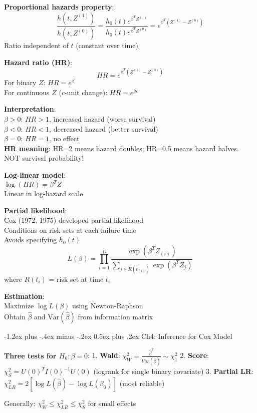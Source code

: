 ﻿\documentclass[10pt,letterpaper]{extarticle}
\makeatletter
\renewcommand{\section}{\@startsection{section}{1}{0mm}%
                                {-1.2ex plus -.4ex minus -.2ex}%
                                {0.5ex plus .2ex}%
                                {\normalfont\normalsize\bfseries}}
\newcommand{\h}[1]{\textbf{#1}}
\makeatother
\begin{document}
\begin{multicols}{3}
\h{Proportional hazards property}: \\
$$\frac{h(t, Z^{(1)})}{h(t, Z^{(0)})} = \frac{h_0(t)e^{\beta^T Z^{(1)}}}{h_0(t)e^{\beta^T Z^{(0)}}} = e^{\beta^T(Z^{(1)}-Z^{(0)})}$$
Ratio independent of $t$ (constant over time)

\h{Hazard ratio (HR)}: \\
$$HR = e^{\beta^T(Z^{(1)} - Z^{(0)})}$$
For binary $Z$: $HR = e^\beta$ \\
For continuous $Z$ ($c$-unit change): $HR = e^{\beta c}$

\h{Interpretation}: \\
$\beta > 0$: $HR > 1$, increased hazard (worse survival) \\
$\beta < 0$: $HR < 1$, decreased hazard (better survival) \\
$\beta = 0$: $HR = 1$, no effect \\
\h{HR meaning}: HR=2 means hazard doubles; HR=0.5 means hazard halves. NOT survival probability!

\h{Log-linear model}: \\
$\log(HR) = \beta^T Z$ \\
Linear in log-hazard scale

\h{Partial likelihood}: \\
Cox (1972, 1975) developed partial likelihood \\
Conditions on risk sets at each failure time \\
Avoids specifying $h_0(t)$ \\
$$L(\beta) = \prod_{i=1}^D \frac{\exp(\beta^T Z_{(i)})}{\sum_{j \in R(t_{(i)})} \exp(\beta^T Z_j)}$$
where $R(t_i)$ = risk set at time $t_i$

\h{Estimation}: \\
Maximize $\log L(\beta)$ using Newton-Raphson \\
Obtain $\hat{\beta}$ and $\text{Var}(\hat{\beta})$ from information matrix

\section{Ch4: Inference for Cox Model}

\h{Three tests for $H_0:\beta=0$}:
1. \h{Wald}: $\chi^2_W = \frac{\hat{\beta}^2}{Var(\hat{\beta})} \sim \chi^2_1$
2. \h{Score}: $\chi^2_S = U(0)^T I(0)^{-1} U(0)$ (logrank for single binary covariate)
3. \h{Partial LR}: $\chi^2_{LR} = 2[\log L(\hat{\beta}) - \log L(\beta_0)]$ (most reliable)

Generally: $\chi^2_W \le \chi^2_{LR} \le \chi^2_S$ for small effects


\end{multicols}
\end{document}
